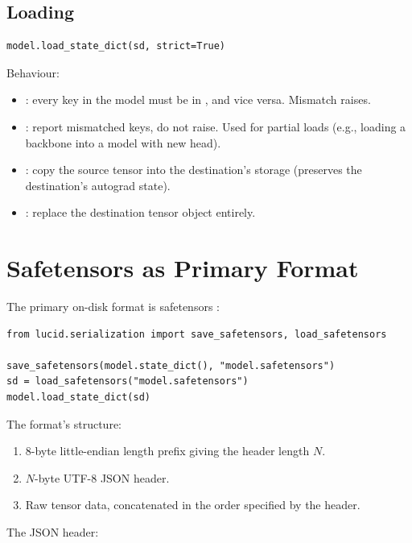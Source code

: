 \subsection{Loading}
\label{ssec:serialization:loading}

\begin{lstlisting}[style=lucid,language=LucidPython]
model.load_state_dict(sd, strict=True)
\end{lstlisting}

Behaviour:
\begin{itemize}
  \item {}: every key in the model must be in
    , and vice versa. Mismatch raises.
  \item {}: report mismatched keys, do not
    raise. Used for partial loads (e.g., loading a backbone
    into a model with new head).
  \item {}: copy the source tensor into the
    destination's storage (preserves the destination's
    autograd state).
  \item {}: replace the destination tensor
    object entirely.
\end{itemize}

\section{Safetensors as Primary Format}
\label{sec:serialization:safetensors_primary}

The primary on-disk format is safetensors \cite{safetensors}:

\begin{lstlisting}[style=lucid,language=LucidPython]
from lucid.serialization import save_safetensors, load_safetensors

save_safetensors(model.state_dict(), "model.safetensors")
sd = load_safetensors("model.safetensors")
model.load_state_dict(sd)
\end{lstlisting}

The format's structure:
\begin{enumerate}
  \item 8-byte little-endian length prefix giving the header
    length $N$.
  \item $N$-byte UTF-8 JSON header.
  \item Raw tensor data, concatenated in the order specified
    by the header.
\end{enumerate}

The JSON header:

